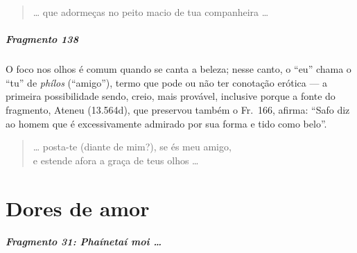 \begin{verse}
\ldots{} que adormeças no peito macio de tua \qb{}companheira \ldots{} 
\end{verse}


\paragraph{Fragmento 138}

{\small O foco nos olhos é comum quando se canta a beleza; nesse canto, o “eu” chama o
“tu” de \textit{phílos }(``amigo”), termo que pode ou não ter conotação
erótica --- a primeira possibilidade sendo, creio, mais provável, inclusive
porque a fonte do fragmento, Ateneu (13.564d), que preservou também o Fr.~166, afirma:
``Safo diz ao homem que é excessivamente admirado por sua forma e tido como belo''.}

\begin{verse}
\ldots{} posta-te (diante de mim?), se és meu amigo,\\
e estende afora a graça de teus olhos \ldots{}
\end{verse}


\chapter{Dores de amor}

\paragraph{Fragmento 31: \textit{Phaínetaí moi \ldots{}}}


